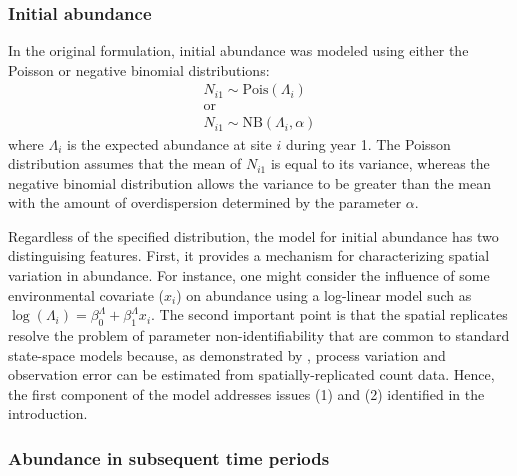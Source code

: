 \documentclass[12pt]{article}
\begin{document}
\subsubsection{Initial abundance}

In the original formulation, initial abundance was
modeled using either the Poisson or negative binomial distributions:
\begin{gather}
N_{i1} \sim \mathrm{Pois}(\Lambda_i) \nonumber \\
\text{or} \nonumber \\
N_{i1} \sim \mathrm{NB}(\Lambda_i, \alpha)
\label{eq:N1}
\end{gather}
where
$\Lambda_i$ is the expected abundance at site $i$ during year 1. The
Poisson distribution assumes that the mean of $N_{i1}$ is equal to its
variance, whereas the negative binomial distribution allows the
variance to be greater than the mean with the amount of overdispersion
determined by the parameter $\alpha$.

Regardless of the specified distribution, the model for initial
abundance has two distinguising features. First, it provides a
mechanism for characterizing spatial variation in abundance. For
instance, one might consider the influence of some environmental
covariate ($x_i$) on abundance using a log-linear
model such as $\log(\Lambda_i) = \beta^{\Lambda}_0 + \beta^{\Lambda}_1
x_{i}$. The second important point is that the spatial replicates resolve the
problem of parameter non-identifiability that are common to standard
state-space models because, as demonstrated by \citet{royle:2004biom},
process variation and observation error can be estimated from
spatially-replicated count data. Hence, the first component of the
model addresses issues (1) and (2) identified in the introduction.

\subsubsection{Abundance in subsequent time periods}
\end{document}
